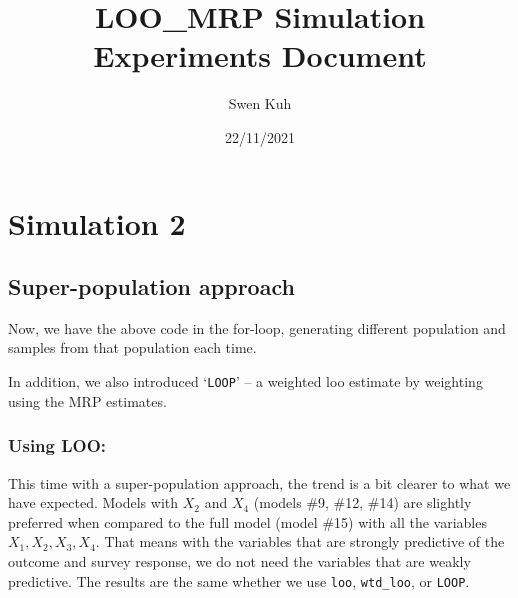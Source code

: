 \documentclass[
]{article}
\title{LOO\_MRP Simulation Experiments Document}
\author{Swen Kuh}
\date{22/11/2021}
\begin{document}
\maketitle

\hypertarget{simulation-2}{%
\section{Simulation 2}\label{simulation-2}}

\hypertarget{super-population-approach}{%
\subsection{Super-population approach}\label{super-population-approach}}

Now, we have the above code in the for-loop, generating different
population and samples from that population each time.

In addition, we also introduced `\texttt{LOOP}' -- a weighted loo
estimate by weighting using the MRP estimates.

\hypertarget{using-loo}{%
\subsubsection{\texorpdfstring{\textbf{Using
LOO}:}{Using LOO:}}\label{using-loo}}

This time with a super-population approach, the trend is a bit clearer
to what we have expected. Models with \(X_2\) and \(X_4\) (models \#9,
\#12, \#14) are slightly preferred when compared to the full model
(model \#15) with all the variables \(X_1, X_2, X_3, X_4\). That means
with the variables that are strongly predictive of the outcome and
survey response, we do not need the variables that are weakly
predictive. The results are the same whether we use \texttt{loo},
\texttt{wtd\_loo}, or \texttt{LOOP}.
\end{document}
